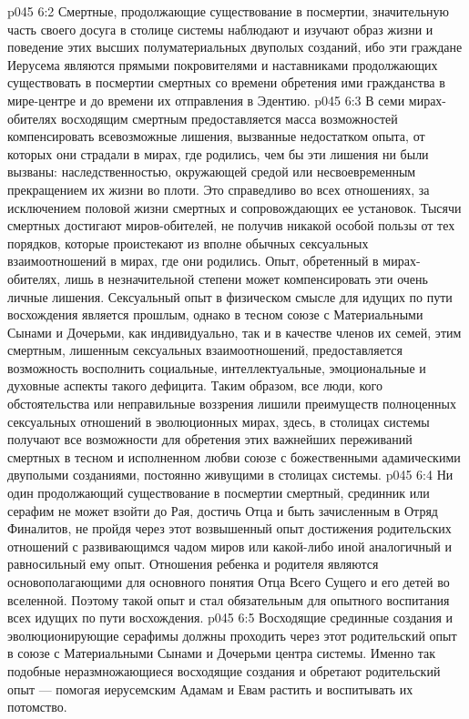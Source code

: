\vs p045 6:2 Смертные, продолжающие существование в посмертии, значительную часть своего досуга в столице системы наблюдают и изучают образ жизни и поведение этих высших полуматериальных двуполых созданий, ибо эти граждане Иерусема являются прямыми покровителями и наставниками продолжающих существовать в посмертии смертных со времени обретения ими гражданства в мире\hyp{}центре и до времени их отправления в Эдентию.
\vs p045 6:3 В семи мирах\hyp{}обителях восходящим смертным предоставляется масса возможностей компенсировать всевозможные лишения, вызванные недостатком опыта, от которых они страдали в мирах, где родились, чем бы эти лишения ни были вызваны: наследственностью, окружающей средой или несвоевременным прекращением их жизни во плоти. Это справедливо во всех отношениях, за исключением половой жизни смертных и сопровождающих ее установок. Тысячи смертных достигают миров\hyp{}обителей, не получив никакой особой пользы от тех порядков, которые проистекают из вполне обычных сексуальных взаимоотношений в мирах, где они родились. Опыт, обретенный в мирах\hyp{}обителях, лишь в незначительной степени может компенсировать эти очень личные лишения. Сексуальный опыт в физическом смысле для идущих по пути восхождения является прошлым, однако в тесном союзе с Материальными Сынами и Дочерьми, как индивидуально, так и в качестве членов их семей, этим смертным, лишенным сексуальных взаимоотношений, предоставляется возможность восполнить социальные, интеллектуальные, эмоциональные и духовные аспекты такого дефицита. Таким образом, все люди, кого обстоятельства или неправильные воззрения лишили преимуществ полноценных сексуальных отношений в эволюционных мирах, здесь, в столицах системы получают все возможности для обретения этих важнейших переживаний смертных в тесном и исполненном любви союзе с божественными адамическими двуполыми созданиями, постоянно живущими в столицах системы.
\vs p045 6:4 \pc Ни один продолжающий существование в посмертии смертный, срединник или серафим не может взойти до Рая, достичь Отца и быть зачисленным в Отряд Финалитов, не пройдя через этот возвышенный опыт достижения родительских отношений с развивающимся чадом миров или какой\hyp{}либо иной аналогичный и равносильный ему опыт. Отношения ребенка и родителя являются основополагающими для основного понятия Отца Всего Сущего и его детей во вселенной. Поэтому такой опыт и стал обязательным для опытного воспитания всех идущих по пути восхождения.
\vs p045 6:5 Восходящие срединные создания и эволюционирующие серафимы должны проходить через этот родительский опыт в союзе с Материальными Сынами и Дочерьми центра системы. Именно так подобные неразмножающиеся восходящие создания и обретают родительский опыт --- помогая иерусемским Адамам и Евам растить и воспитывать их потомство.

